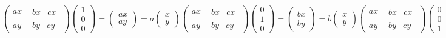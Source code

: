 \documentclass[oneside,english]{amsbook}
\numberwithin{section}{chapter}
\theoremstyle{plain}
\theoremstyle{definition}
\begin{document}
\[{\begin{pmatrix}
		ax & \begin{matrix}
			bx & cx
		\end{matrix} \\
		ay & \begin{matrix}
			by & cy
		\end{matrix}
	\end{pmatrix}\begin{pmatrix}
		1 \\
		0 \\
		0
	\end{pmatrix} = \begin{pmatrix}
		ax \\
		ay
	\end{pmatrix} = a\begin{pmatrix}
		x \\
		y
	\end{pmatrix}
}{\begin{pmatrix}
		ax & \begin{matrix}
			bx & cx
		\end{matrix} \\
		ay & \begin{matrix}
			by & cy
		\end{matrix}
	\end{pmatrix}\begin{pmatrix}
		0 \\
		1 \\
		0
	\end{pmatrix} = \begin{pmatrix}
		bx \\
		by
	\end{pmatrix} = b\begin{pmatrix}
		x \\
		y
	\end{pmatrix}
}{\begin{pmatrix}
		ax & \begin{matrix}
			bx & cx
		\end{matrix} \\
		ay & \begin{matrix}
			by & cy
		\end{matrix}
	\end{pmatrix}\begin{pmatrix}
		0 \\
		0 \\
		1
	\end{pmatrix} = \begin{pmatrix}
		cx \\
		cy
	\end{pmatrix} = c\begin{pmatrix}
		x \\
		y
\end{pmatrix}}\]
\end{document}
